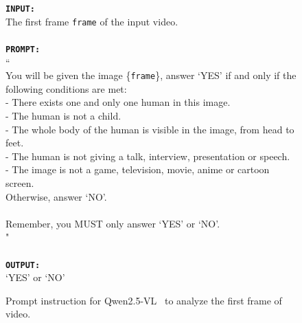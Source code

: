 \begin{figure}
    \begin{widecodebox}
        \texttt{\textbf{INPUT:}}\\
        The first frame \texttt{frame} of the input video.\\
        \\
        \texttt{\textbf{PROMPT:}}\\
        ``\\
        You will be given the image \{\texttt{frame}\}, answer `YES' if and only if the following conditions are met:\\
        - There exists one and only one human in this image.\\
        - The human is not a child.\\
        - The whole body of the human is visible in the image, from head to feet.\\
        - The human is not giving a talk, interview, presentation or speech.\\
        - The image is not a game, television, movie, anime or cartoon screen.\\
        Otherwise, answer `NO'.\\
        \\
        Remember, you MUST only answer `YES' or `NO'.\\
        "\\
        \\
        \texttt{\textbf{OUTPUT:}}\\
        `YES' or `NO'
    \end{widecodebox}
    \vspace{-10pt}
    \caption{Prompt instruction for Qwen2.5-VL~\cite{qwen3} to analyze the first frame of video.}
\label{fig:qwenvl_prompt}
\end{figure}

